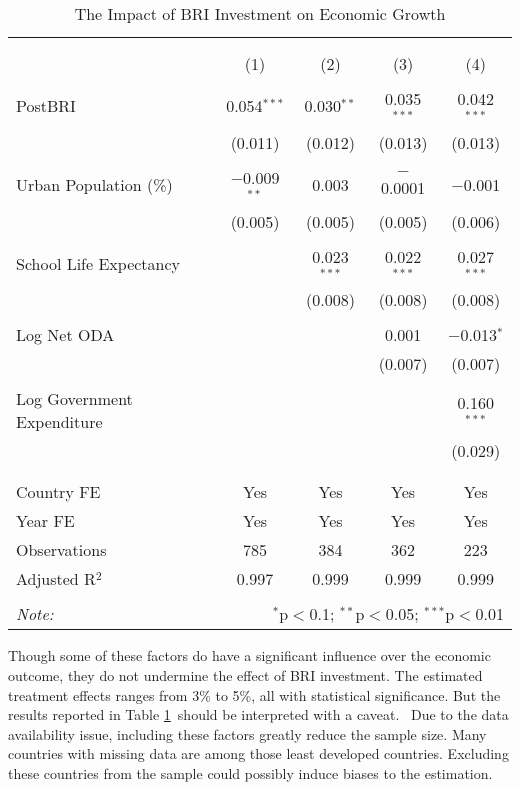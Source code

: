\documentclass[10pt,a4paper]{article}
\begin{document}
\begin{table}[!htbp] \centering
  \caption{{The Impact of BRI Investment on Economic Growth}}
  \label{tab:timevar}
\begin{tabular}{@{\extracolsep{5pt}}lcccc}
\\[-1.8ex]\hline
\hline \\[-1.8ex]
\\[-1.8ex] & (1) & (2) & (3) & (4)\\
\hline \\[-1.8ex]
 PostBRI & 0.054$^{***}$ & 0.030$^{**}$ & 0.035$^{***}$ & 0.042$^{***}$ \\
  & (0.011) & (0.012) & (0.013) & (0.013) \\
  & & & & \\
 Urban Population (\%) & $-$0.009$^{**}$ & 0.003 & $-$0.0001 & $-$0.001 \\
  & (0.005) & (0.005) & (0.005) & (0.006) \\
  & & & & \\
 School Life Expectancy &  & 0.023$^{***}$ & 0.022$^{***}$ & 0.027$^{***}$ \\
  &  & (0.008) & (0.008) & (0.008) \\
  & & & & \\
 Log Net ODA &  &  & 0.001 & $-$0.013$^{*}$ \\
  &  &  & (0.007) & (0.007) \\
  & & & & \\
 Log Government Expenditure &  &  &  & 0.160$^{***}$ \\
  &  &  &  & (0.029) \\
  & & & & \\
\hline \\[-1.8ex]
Country FE & Yes & Yes & Yes & Yes \\
Year FE & Yes & Yes & Yes & Yes \\
Observations & 785 & 384 & 362 & 223 \\
Adjusted R$^{2}$ & 0.997 & 0.999 & 0.999 & 0.999 \\
\hline
\hline \\[-1.8ex]
\textit{Note:}  & \multicolumn{4}{r}{$^{*}$p$<$0.1; $^{**}$p$<$0.05; $^{***}$p$<$0.01} \\
\end{tabular}

\end{table}

Though some of these factors do have a significant influence over the
economic outcome, they do not undermine the effect of BRI investment.
The estimated treatment effects ranges from 3\% to 5\%, all with
statistical significance. But the results reported in Table
{\ref{tab:timevar}}~should be interpreted with a
caveat. ~Due to the data availability issue, including these factors
greatly reduce the sample size. Many countries with missing data are
among those least developed countries. Excluding these countries from
the sample could possibly induce biases to the estimation.~
\end{document}
